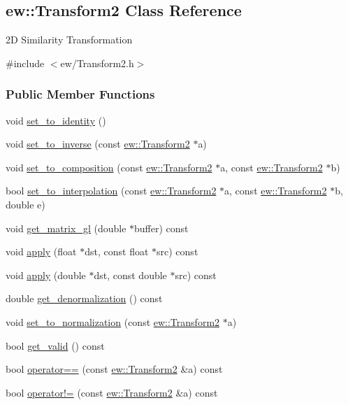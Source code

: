 \hypertarget{classew_1_1Transform2}{
\subsection{ew::Transform2 Class Reference}
\label{classew_1_1Transform2}
}


2D Similarity Transformation  




{\ttfamily \#include $<$ew/Transform2.h$>$}

\subsubsection*{Public Member Functions}
\begin{DoxyCompactItemize}
\item 
void \hyperlink{classew_1_1Transform2_aa6447021754fc0ac96b5b73aa54de22e}{set\_\-to\_\-identity} ()
\item 
void \hyperlink{classew_1_1Transform2_abdd12e03e96277ee83c8f439dd00821f}{set\_\-to\_\-inverse} (const \hyperlink{classew_1_1Transform2}{ew::Transform2} $\ast$a)
\item 
void \hyperlink{classew_1_1Transform2_a4d46e2ff4c77823f87be5e837f65673d}{set\_\-to\_\-composition} (const \hyperlink{classew_1_1Transform2}{ew::Transform2} $\ast$a, const \hyperlink{classew_1_1Transform2}{ew::Transform2} $\ast$b)
\item 
bool \hyperlink{classew_1_1Transform2_adc9f7b87aa3b37f325d73a501d3a1bf2}{set\_\-to\_\-interpolation} (const \hyperlink{classew_1_1Transform2}{ew::Transform2} $\ast$a, const \hyperlink{classew_1_1Transform2}{ew::Transform2} $\ast$b, double e)
\item 
void \hyperlink{classew_1_1Transform2_a8735d178c7921153e9b2f71fcf92e2ec}{get\_\-matrix\_\-gl} (double $\ast$buffer) const 
\item 
void \hyperlink{classew_1_1Transform2_ac7325c77a6a7c3399a7b624dea82fdbe}{apply} (float $\ast$dst, const float $\ast$src) const 
\item 
void \hyperlink{classew_1_1Transform2_a1fd2bcd531bde0c2826f956023d73970}{apply} (double $\ast$dst, const double $\ast$src) const 
\item 
double \hyperlink{classew_1_1Transform2_abf4bb168bab65f3e669ad243ca0518b0}{get\_\-denormalization} () const 
\item 
void \hyperlink{classew_1_1Transform2_a98771ebfe08e76140e43d5fc36bf9d32}{set\_\-to\_\-normalization} (const \hyperlink{classew_1_1Transform2}{ew::Transform2} $\ast$a)
\item 
bool \hyperlink{classew_1_1Transform2_a4ce6a568c1872859dbba9430f2c48cd2}{get\_\-valid} () const 
\item 
bool \hyperlink{classew_1_1Transform2_a5d31600adea1c16d3bf3b2128cd232a7}{operator==} (const \hyperlink{classew_1_1Transform2}{ew::Transform2} \&a) const 
\item 
bool \hyperlink{classew_1_1Transform2_a48c2ef88a4858220a25fc9ca24b38c99}{operator!=} (const \hyperlink{classew_1_1Transform2}{ew::Transform2} \&a) const 
\end{DoxyCompactItemize}
